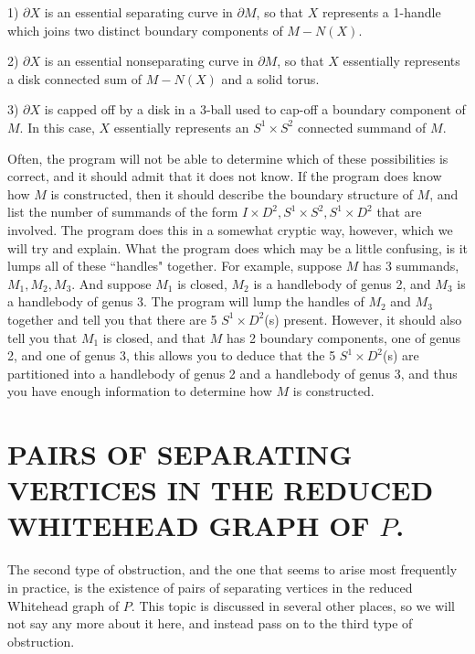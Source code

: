\documentclass[12pt]{amsart}
\begin{document}
                1)     $ \partial X$ is an essential separating curve in $\partial M$, so that $X$ represents a 1-handle which
                        joins two distinct boundary components of $M - N(X)$.
                
                2)      $\partial X$ is an essential nonseparating curve in $\partial M$, so that $X$ essentially represents a
                        disk connected sum of $M - N(X)$ and a solid torus.
                
                3)      $\partial X$ is capped off by a disk in a 3-ball used to cap-off a boundary component of $M$.
                        In this case, $X$ essentially represents an $S^1 \times S^2$ connected summand of $M$.
                        
                Often, the program will not be able to determine which of these possibilities is
        correct, and it should admit that it does not know. If the program does know how $M$ is
        constructed, then it should describe the boundary structure of $M$, and list the number
        of summands of the form $I \times D^2, S^1 \times S^2, S^1 \times D^2$ that are involved. The program does
        this in a somewhat cryptic way, however, which we will try and explain.
                What the program does which may be a little confusing, is it lumps all of these
         ``handles" together. For example, suppose $M$ has 3 summands, $M_1,M_2,M_3$. And suppose $M_1$ is
        closed, $M_2$ is a handlebody of genus 2, and $M_3$ is a handlebody of genus 3.
                The program will lump the handles of $M_2$ and $M_3$ together and tell you that there are
        5 $S^1 \times D^2$(s) present. However, it should also tell you that $M_1$ is closed, and that $M$ has
        2 boundary components, one of genus 2, and one of genus 3, this allows you to deduce that
        the 5 $S^1 \times D^2$(s) are partitioned into a handlebody of genus 2 and a handlebody of genus 3,
        and thus you have enough information to determine how $M$ is constructed.
                
                                
                     \section{PAIRS OF SEPARATING VERTICES IN THE REDUCED WHITEHEAD GRAPH OF $P$.}
                        
                                
                The second type of obstruction, and the one that seems to arise most frequently in
        practice, is the existence of pairs of separating vertices in the reduced Whitehead
        graph of $P$. This topic is discussed in several other places, so we will not say any more
        about it here, and instead pass on to the third type of obstruction.
                        
\end{document}
